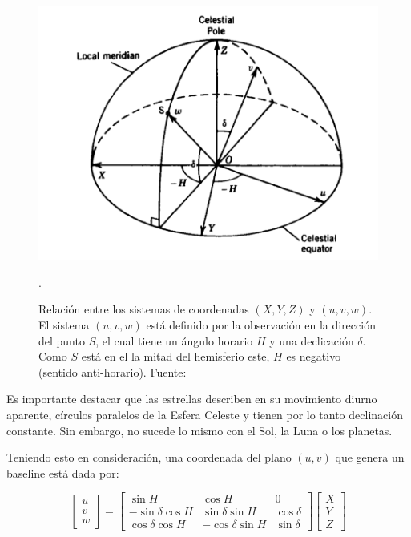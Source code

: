\begin{figure}[h!]
\centering
\includegraphics[scale=0.3]{images/ecuatorial2.png}
\caption{%
Relación entre los sistemas de coordenadas $(X,Y,Z)$ y $(u,v,w)$. El sistema $(u,v,w)$ está definido por la observación en la dirección del punto $S$, el cual tiene un ángulo horario $H$ y una declicación $\delta$. Como $S$ está en el la mitad del hemisferio este, $H$ es negativo (sentido anti-horario). Fuente: \citep{libroAstro}}.
\label{fig:ecuatorial2}
\end{figure}

Es importante destacar que las estrellas describen en su movimiento diurno aparente, círculos paralelos de la Esfera Celeste y tienen por lo tanto declinación constante. Sin embargo, no sucede lo mismo con el Sol, la Luna o los planetas.

Teniendo esto en consideración, una coordenada del plano $(u,v)$ que genera un baseline está dada por:

\begin{equation}
\begin{bmatrix}
u\\
v\\
w
\end{bmatrix}
=
\begin{bmatrix}
\sin{H} & \cos{H} & 0\\
-\sin{\delta}\cos{H} & \sin{\delta}\sin{H} & \cos{\delta}\\
\cos{\delta}\cos{H} & -\cos{\delta}\sin{H} & \sin{\delta}
\end{bmatrix}
\begin{bmatrix}
X\\
Y\\
Z
\end{bmatrix}
\label{eq:uvw}
\end{equation}



